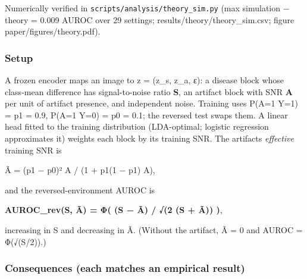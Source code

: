 {\small
Numerically verified in \texttt{scripts/analysis/theory\_sim.py} (max \textbar simulation − theory\textbar{} = 0.009 AUROC over 29 settings;
results/theory/theory\_sim.csv; figure paper/figures/theory.pdf).

\subsubsection{Setup}\label{setup}

A frozen encoder maps an image to z = (z\_s, z\_a, ε): a disease block whose class-mean difference has signal-to-noise
ratio \textbf{S}, an artifact block with SNR \textbf{A} per unit of artifact presence, and independent noise. Training uses
P(A=1 \textbar{} Y=1) = p1 = 0.9, P(A=1 \textbar{} Y=0) = p0 = 0.1; the reversed test swaps them. A linear head fitted to the training
distribution (LDA-optimal; logistic regression approximates it) weights each block by its training SNR. The
artifact\textquotesingle s \emph{effective} training SNR is

Ã = (p1 − p0)² A / (1 + p1(1 − p1) A),

and the reversed-environment AUROC is

\textbf{AUROC\_rev(S, Ã) = Φ( (S − Ã) / √(2 (S + Ã)) )},

increasing in S and decreasing in Ã. (Without the artifact, Ã = 0 and AUROC = Φ(√(S/2)).)

\subsubsection{Consequences (each matches an empirical result)}\label{consequences-each-matches-an-empirical-result}

\begin{enumerate}
\def\labelenumi{\arabic{enumi}.}


\end{enumerate}}

